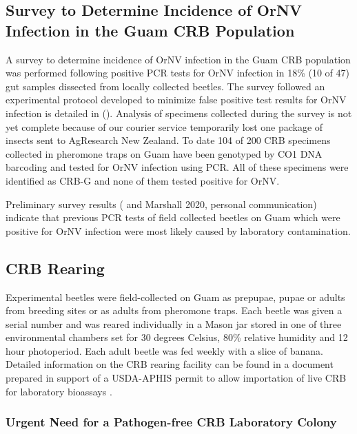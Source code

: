 \documentclass[12pt,
letterpaper,english,bibliography=totocnumbered, abstract=on]{scrartcl}
\begin{document}
\subsection{Survey to Determine Incidence of OrNV Infection in the Guam CRB Population}

A survey to determine incidence of OrNV infection in the Guam CRB population was performed following positive PCR tests for OrNV infection in 18\% (10 of 47) gut samples dissected from locally collected beetles. The survey followed an experimental protocol developed to minimize false positive test results for OrNV infection is detailed in (\cite{mooreExperimentalPlanDetermining2020}).  Analysis of specimens collected during the survey is not yet complete because of our courier service temporarily lost one package of insects sent to AgResearch New Zealand. To date 104 of 200 CRB specimens collected in pheromone traps on Guam have been genotyped by CO1 DNA barcoding and tested for OrNV infection using PCR. All of these specimens were identified as CRB-G and none of them tested positive for OrNV. 

Preliminary survey results (\cite{graselaInvestigationDeterminePresence2020} and Marshall 2020, personal communication) indicate that previous PCR tests of field collected beetles on Guam which were positive for OrNV infection were most likely caused by laboratory contamination.

\clearpage
\subsection{CRB Rearing}
\label{sec: rearing}

Experimental beetles were field-collected on Guam as prepupae, pupae or adults from breeding sites or as adults from pheromone traps.  Each beetle was given a serial number and was reared individually in a Mason jar stored in one of three environmental chambers set for 30 degrees Celsius, 80\% relative humidity and 12 hour photoperiod. Each adult beetle was fed weekly with a slice of banana. Detailed information on the CRB rearing facility can be found in a document prepared in support of a USDA-APHIS permit to allow importation of live CRB for laboratory bioassays \parencite{moore_additional_2019}.

\subsubsection{Urgent Need for a Pathogen-free CRB Laboratory Colony} 
\end{document}
